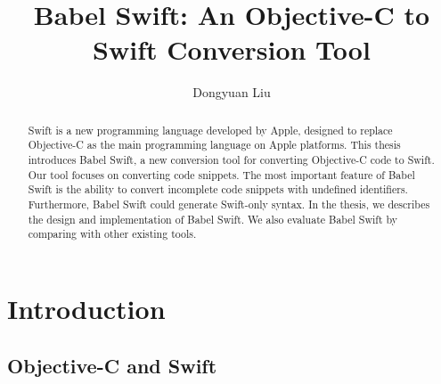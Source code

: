 \documentclass{sfuthesis}
\title{Babel Swift: An Objective-C to Swift Conversion Tool}
\author{Dongyuan Liu}
\begin{document}
\frontmatter
\maketitle{}
\makecommittee{}

\begin{abstract}
Swift is a new programming language developed by Apple, designed to replace Objective-C as the main programming language on Apple platforms. This thesis introduces Babel Swift, a new conversion tool for converting Objective-C code to Swift. Our tool focuses on converting code snippets. The most important feature of Babel Swift is the ability to convert incomplete code snippets with undefined identifiers. Furthermore, Babel Swift could generate Swift-only syntax. In the thesis, we describes the design and implementation of Babel Swift. We also evaluate Babel Swift by comparing with other existing tools.
\end{abstract}




\begin{acknowledgements} %

\end{acknowledgements}

\tableofcontents\clearpage
{}\listoftables\clearpage
{}\listoffigures\clearpage
{}\listoflistings





%
%

\mainmatter%

\chapter{Introduction}

\section{Objective-C and Swift}
\end{document}
